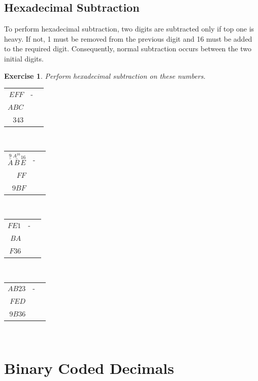 \documentclass[12pt, a4paper]{report}
\newtheorem{exercise}{Exercise}
\begin{document}
	\subsection{Hexadecimal Subtraction}
	\quad	To perform hexadecimal subtraction, two digits are subtracted only if top one is heavy. If not, 1 must be removed from the previous digit and 16 must be added to the required digit. Consequently, normal subtraction occurs between the two initial digits.
	\begin{exercise}
		Perform hexadecimal subtraction on these numbers.
	\end{exercise}
	\begin{center}
		\begin{multicols}{2}
			\begin{tabular}{rll}
				$EFF$ & - &   \\
				$ABC$ &   &   \\ \cline{1-1}
				$343$ &   &   
			\end{tabular}\\
			\bigskip
			\bigskip
			\begin{tabular}{rll}
				$\overset{9}{\bar{A}}\overset{A^{16}}{\bar{B}}\overset{16}{E}$ & - &   \\
				$ FF$                                                          &   &   \\ \cline{1-1}
				$9BF$                                                          &   &   
			\end{tabular}\\
			\bigskip
			\bigskip
			\begin{tabular}{rll}
				$FE1$ & - &   \\
				$BA$  &   &   \\ \cline{1-1}
				$F36$ &   &   
			\end{tabular}\\
			\bigskip
			\bigskip
			\begin{tabular}{rll}
				$AB23$ & - &   \\
				$ FED$ &   &   \\ \cline{1-1}
				$9B36$ &   &   
			\end{tabular}\\
		\end{multicols}
	\end{center}
	\section{Binary Coded Decimals}
\end{document}
